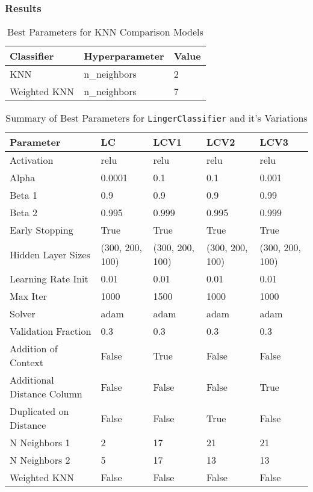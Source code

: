 \documentclass[a4paper, 12pt]{report}
\begin{document}
\subsubsection{Results}

\begin{table}[H]
    \centering
    \caption{Best Parameters for KNN Comparison Models}
    \label{tab:best_parameters_combined_knn_exp1}
    \begin{tabular}{|l|l|l|}
    \toprule
    \textbf{Classifier} & \textbf{Hyperparameter} & \textbf{Value} \\
    \midrule
    KNN & n\_neighbors & 2 \\
    Weighted KNN & n\_neighbors & 7 \\
    \bottomrule
    \end{tabular}
\end{table}
\clearpage

\begin{table}[H]
    \centering
    \caption{Summary of Best Parameters for \texttt{LingerClassifier} and it's Variations}
    \label{tab:best_parameters_summary_exp1}
    \begin{tabular}{|l|l|l|l|l|}
    \hline
    \textbf{Parameter} & \textbf{LC} & \textbf{LCV1} & \textbf{LCV2} & \textbf{LCV3} \\
    \hline
    Activation & relu & relu & relu & relu \\
    Alpha & 0.0001 & 0.1 & 0.1 & 0.001 \\
    Beta 1 & 0.9 & 0.9 & 0.9 & 0.99 \\
    Beta 2 & 0.995 & 0.999 & 0.995 & 0.999 \\
    Early Stopping & True & True & True & True \\
    Hidden Layer Sizes & (300, 200, 100) & (300, 200, 100) & (300, 200, 100) & (300, 200, 100) \\
    Learning Rate Init & 0.01 & 0.01 & 0.01 & 0.01 \\
    Max Iter & 1000 & 1500 & 1000 & 1000 \\
    Solver & adam & adam & adam & adam \\
    Validation Fraction & 0.3 & 0.3 & 0.3 & 0.3 \\
    Addition of Context & False & True & False & False \\
    Additional Distance Column & False & False & False & True \\
    Duplicated on Distance & False & False & True & False \\
    N Neighbors 1 & 2 & 17 & 21 & 21 \\
    N Neighbors 2 & 5 & 17 & 13 & 13 \\
    Weighted KNN & False & False & False & False \\
    \hline
    \end{tabular}
\end{table}
\end{document}

